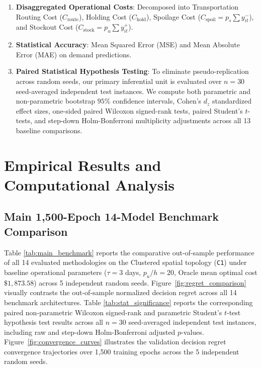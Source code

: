 \documentclass[11pt,a4paper]{article}
\theoremstyle{definition}
\theoremstyle{remark}
\begin{document}
\begin{enumerate}[leftmargin=*]
\begin{itemize}
    \end{itemize}
    \item \textbf{Disaggregated Operational Costs}: Decomposed into Transportation Routing Cost ($C_{\text{route}}$), Holding Cost ($C_{\text{hold}}$), Spoilage Cost ($C_{\text{spoil}} = p_s \sum y_{it}^-$), and Stockout Cost ($C_{\text{stock}} = p_u \sum y_{it}^+$).
    \item \textbf{Statistical Accuracy}: Mean Squared Error (MSE) and Mean Absolute Error (MAE) on demand predictions.
    \item \textbf{Paired Statistical Hypothesis Testing}: To eliminate pseudo-replication across random seeds, our primary inferential unit is evaluated over $n = 30$ seed-averaged independent test instances. We compute both parametric and non-parametric bootstrap $95\%$ confidence intervals, Cohen's $d_z$ standardized effect sizes, one-sided paired Wilcoxon signed-rank tests, paired Student's $t$-tests, and step-down Holm-Bonferroni multiplicity adjustments \citep{holm1979simple} across all 13 baseline comparisons.
\end{enumerate}

\section{Empirical Results and Computational Analysis}
\label{sec:results}

\subsection{Main 1,500-Epoch 14-Model Benchmark Comparison}
\label{subsec:main_benchmark}
Table \ref{tab:main_benchmark} reports the comparative out-of-sample performance of all 14 evaluated methodologies on the Clustered spatial topology (\texttt{C1}) under baseline operational parameters ($\tau = 3$ days, $p_u/h = 20$, Oracle mean optimal cost $\$1,873.58$) across 5 independent random seeds. Figure~\ref{fig:regret_comparison} visually contrasts the out-of-sample normalized decision regret across all 14 benchmark architectures. Table \ref{tab:stat_significance} reports the corresponding paired non-parametric Wilcoxon signed-rank and parametric Student's $t$-test hypothesis test results across all $n = 30$ seed-averaged independent test instances, including raw and step-down Holm-Bonferroni adjusted $p$-values. Figure~\ref{fig:convergence_curves} illustrates the validation decision regret convergence trajectories over 1,500 training epochs across the 5 independent random seeds.
\end{document}
